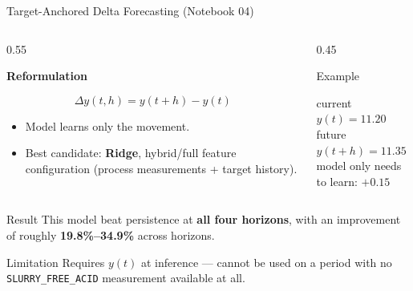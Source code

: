 \documentclass[11pt,aspectratio=169]{beamer}
\begin{document}
\begin{frame}{Target-Anchored Delta Forecasting (Notebook 04)}

\begin{columns}[T]

\begin{column}{0.55\textwidth}

\textbf{Reformulation}

\[
\Delta y(t,h) = y(t+h) - y(t)
\]

\begin{itemize}
    \small
    \item Model learns only the movement.
    \item Best candidate: \textbf{Ridge}, hybrid/full feature configuration
    (process measurements + target history).
\end{itemize}

\end{column}

\begin{column}{0.45\textwidth}

\begin{exampleblock}{Example}
\small

current $y(t) = 11.20$ \\

future $y(t+h) = 11.35$ \\

model only needs to learn: $+0.15$

\end{exampleblock}

\end{column}

\end{columns}

\vspace{0.2cm}

\begin{block}{Result}
This model beat persistence at \textbf{all four horizons}, with an improvement
of roughly \textbf{19.8\%--34.9\%} across horizons.
\end{block}

\begin{alertblock}{Limitation}
\small
Requires $y(t)$ at inference --- cannot be used on a period with no
\texttt{SLURRY\_FREE\_ACID} measurement available at all.
\end{alertblock}

\end{frame}
\end{document}
